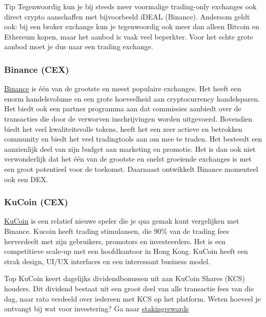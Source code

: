 \bigskip

\begin{tipbox}{Tip}
          Tegenwoordig kun je bij steeds meer voormalige trading-only exchanges ook direct crypto aanschaffen met bijvoorbeeld iDEAL (Binance). Andersom geldt ook: bij een broker exchange kun je tegenwoordig ook meer dan alleen Bitcoin en Ethereum kopen, maar het aanbod is vaak veel beperkter. Voor het echte grote aanbod moet je dus naar een trading exchange.
\end{tipbox}

\subsubsection*{Binance (CEX)} 
\href{https://www.binance.com/?ref=35602166}{Binance} is {\'e}{\'e}n van de grootste en meest populaire exchanges. Het heeft een enorm handelsvolume en een grote hoeveelheid aan cryptocurrency handelsparen. Het  biedt ook een partner programma aan dat commissies aanbiedt over de transacties die door de verworven inschrijvingen worden uitgevoerd. 
Bovendien biedt het veel kwaliteitsvolle tokens, heeft het een zeer actieve en betrokken community en biedt het veel tradingtools aan om mee te traden. Het besteedt een aanzienlijk deel van zijn budget aan marketing en promotie. Het is dan ook niet verwonderlijk dat het {\'e}{\'e}n van de grootste en snelst groeiende exchanges is met een groot potentieel voor de toekomst. Daarnaast ontwikkelt Binance momenteel ook een DEX.


\subsubsection*{KuCoin (CEX)}
\href{https://www.kucoin.com/#/?r=aNuPeb}{KuCoin} is een relatief nieuwe speler die je qua gemak kunt vergelijken met Binance. Kucoin heeft trading stimulansen, die 90\% van de trading fees herverdeelt  met zijn gebruikers, promotors en investeerders. Het is een competitieve scale-up met een hoofdkantoor in Hong Kong. KuCoin heeft een strak design, UI/UX interfaces en een interessant business model. \medskip

    \begin{topbox}{Top}
    KuCoin keert dagelijks dividendbonussen uit aan KuCoin Shares (KCS) houders. Dit dividend bestaat uit een groot deel van alle transactie fees van die dag, naar rato verdeeld over iedereen met KCS op het platform.
    \tcblower
    Weten hoeveel je ontvangt bij wat voor investering? Ga naar \href{https://www.stakingrewards.com/asset/kucoin-shares}{stakingrewards}
    \end{topbox}



